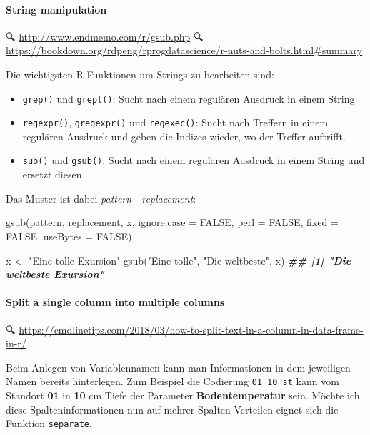 \documentclass[
]{article}
\newenvironment{Shaded}{\begin{snugshade}}{\end{snugshade}}
\newcommand{\DocumentationTok}[1]{\textcolor[rgb]{0.56,0.35,0.01}{\textbf{\textit{#1}}}}
\newcommand{\FunctionTok}[1]{\textcolor[rgb]{0.00,0.00,0.00}{#1}}
\newcommand{\NormalTok}[1]{#1}
\newcommand{\OtherTok}[1]{\textcolor[rgb]{0.56,0.35,0.01}{#1}}
\newcommand{\StringTok}[1]{\textcolor[rgb]{0.31,0.60,0.02}{#1}}
\providecommand{\tightlist}{%
  \setlength{\itemsep}{0pt}\setlength{\parskip}{0pt}}
\begin{document}
\hypertarget{string-manipulation}{%
\paragraph{String manipulation}\label{string-manipulation}}

🔍 \url{http://www.endmemo.com/r/gsub.php}
🔍 \url{https://bookdown.org/rdpeng/rprogdatascience/r-nuts-and-bolts.html\#summary}

Die wichtigsten R Funktionen um Strings zu bearbeiten sind:

\begin{itemize}
\tightlist
\item
  \texttt{grep()} und \texttt{grepl()}: Sucht nach einem regulären Ausdruck in einem String
\item
  \texttt{regexpr()}, \texttt{gregexpr()} und \texttt{regexec()}: Sucht nach Treffern in einem regulären Ausdruck und geben die Indizes wieder, wo der Treffer auftrifft.
\item
  \texttt{sub()} und \texttt{gsub()}: Sucht nach einem regulären Ausdruck in einem String und ersetzt diesen
\end{itemize}

Das Muster ist dabei \emph{pattern} - \emph{replacement}:

gsub(pattern, replacement, x, ignore.case = FALSE, perl = FALSE, fixed = FALSE, useBytes = FALSE)

\begin{Shaded}
\begin{Highlighting}[]
\NormalTok{x }\OtherTok{\textless{}{-}} \StringTok{"Eine tolle Exursion"}
\FunctionTok{gsub}\NormalTok{(}\StringTok{"Eine tolle"}\NormalTok{, }\StringTok{"Die weltbeste"}\NormalTok{, x)}
\DocumentationTok{\#\# [1] "Die weltbeste Exursion"}
\end{Highlighting}
\end{Shaded}

\hypertarget{split-a-single-column-into-multiple-columns}{%
\paragraph{Split a single column into multiple columns}\label{split-a-single-column-into-multiple-columns}}

🔍 \url{https://cmdlinetips.com/2018/03/how-to-split-text-in-a-column-in-data-frame-in-r/}

Beim Anlegen von Variablennamen kann man Informationen in dem jeweiligen Namen bereits hinterlegen. Zum Beispiel die Codierung \texttt{01\_10\_st} kann vom Standort \textbf{01} in \textbf{10} cm Tiefe der Parameter \textbf{Bodentemperatur} sein. Möchte ich diese Spalteninformationen nun auf mehrer Spalten Verteilen eignet sich die Funktion \texttt{separate}.
\end{document}
